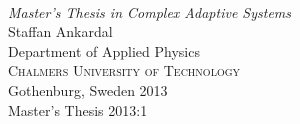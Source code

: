 \begin{titlepage}

\mbox{}
\vfill
\addtolength{\voffset}{2cm}
\begin{flushleft}
	{ \\[0.5cm]
	\emph{\Large Master's Thesis in Complex Adaptive Systems} \\[.8cm]
	
	{\huge Staffan Ankardal}\\[.8cm]
	
	{\Large Department of Applied Physics\\
	\textsc{Chalmers University of Technology} \\
	Gothenburg, Sweden 2013 \\
	Master's Thesis 2013:1\\
	} 
	}
\end{flushleft}

\end{titlepage}
\ClearShipoutPicture

